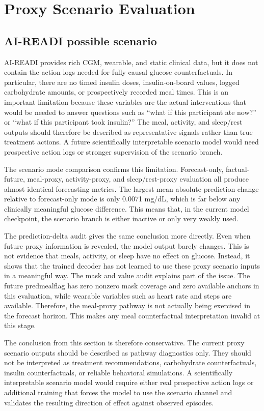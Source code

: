 \section{Proxy Scenario Evaluation}
\label{sec:proxy}

\subsection{AI-READI possible scenario }
AI-READI provides rich CGM, wearable, and static clinical data, but it does not contain the action logs needed for fully causal glucose counterfactuals. In particular, there are no timed insulin doses, insulin-on-board values, logged carbohydrate amounts, or prospectively recorded meal times. This is an important limitation because these variables are the actual interventions that would be needed to answer questions such as “what if this participant ate now?” or “what if this participant took insulin?”
The meal, activity, and sleep/rest outputs should therefore be described as representative signals rather than true treatment actions. A future scientifically interpretable scenario model would need prospective action logs or stronger supervision of the scenario branch.

The scenario mode comparison confirms this limitation. Forecast-only, factual-future, meal-proxy, activity-proxy, and sleep/rest-proxy evaluation all produce almost identical forecasting metrics. The largest mean absolute prediction change relative to forecast-only mode is only 0.0071 mg/dL, which is far below any clinically meaningful glucose difference. This means that, in the current model checkpoint, the scenario branch is either inactive or only very weakly used.

The prediction-delta audit gives the same conclusion more directly. Even when future proxy information is revealed, the model output barely changes. This is not evidence that meals, activity, or sleep have no effect on glucose. Instead, it shows that the trained decoder has not learned to use these proxy scenario inputs in a meaningful way. The mask and value audit explains part of the issue. The future predmealflag has zero nonzero mask coverage and zero available anchors in this evaluation, while wearable variables such as heart rate and steps are available. Therefore, the meal-proxy pathway is not actually being exercised in the forecast horizon. This makes any meal counterfactual interpretation invalid at this stage.

\GeneratedScenarioTables

\GeneratedScenarioFigures

The conclusion from this section is therefore conservative. The current proxy scenario outputs should be described as pathway diagnostics only. They should not be interpreted as treatment recommendations, carbohydrate counterfactuals, insulin counterfactuals, or reliable behavioral simulations. A scientifically interpretable scenario model would require either real prospective action logs or additional training that forces the model to use the scenario channel and validates the resulting direction of effect against observed episodes.
